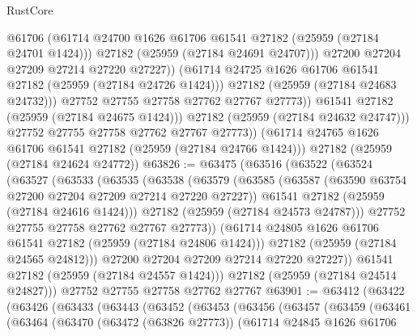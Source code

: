 \begin{lexlean}{RustCore}
\begin{coremodule}
                        @61706
                        (@61714 @24700 @1626 @61706 @61541 @27182 (@25959 (@27184 @24701 @1424)))
                        @27182
                        (@25959 (@27184 @24691 @24707)))
                      @27200
                      @27204
                      @27209
                      @27214
                      @27220
                      @27227))
                  (@61714 @24725 @1626 @61706 @61541 @27182 (@25959 (@27184 @24726 @1424)))
                  @27182
                  (@25959 (@27184 @24683 @24732)))
                @27752
                @27755
                @27758
                @27762
                @27767
                @27773))
            @61541
            @27182
            (@25959 (@27184 @24675 @1424)))
          @27182
          (@25959 (@27184 @24632 @24747)))
        @27752
        @27755
        @27758
        @27762
        @27767
        @27773))
    (@61714 @24765 @1626 @61706 @61541 @27182 (@25959 (@27184 @24766 @1424)))
    @27182
    (@25959 (@27184 @24624 @24772))
@63826 := @63475
    (@63516
      (@63522
        (@63524
          (@63527
            (@63533
              (@63535
                (@63538
                  (@63579
                    (@63585
                      (@63587 (@63590 @63754 @27200 @27204 @27209 @27214 @27220 @27227))
                      @61541
                      @27182
                      (@25959 (@27184 @24616 @1424)))
                    @27182
                    (@25959 (@27184 @24573 @24787)))
                  @27752
                  @27755
                  @27758
                  @27762
                  @27767
                  @27773))
              (@61714 @24805 @1626 @61706 @61541 @27182 (@25959 (@27184 @24806 @1424)))
              @27182
              (@25959 (@27184 @24565 @24812)))
            @27200
            @27204
            @27209
            @27214
            @27220
            @27227))
        @61541
        @27182
        (@25959 (@27184 @24557 @1424)))
      @27182
      (@25959 (@27184 @24514 @24827)))
    @27752
    @27755
    @27758
    @27762
    @27767
@63901 := @63412
    (@63422
      (@63426
        (@63433
          (@63443
            (@63452
              (@63453
                (@63456
                  (@63457
                    (@63459
                      (@63461
                        (@63464
                          (@63470
                            (@63472 (@63826 @27773))
                            (@61714
                              @24845
                              @1626
                              @61706

\end{coremodule}
\end{lexlean}
